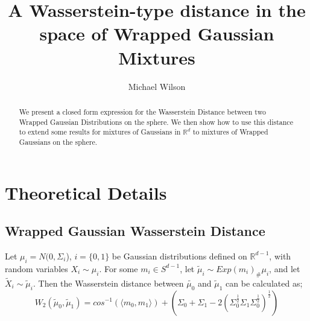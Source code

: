 \documentclass[]{article}
\title{A Wasserstein-type distance in the space of Wrapped Gaussian Mixtures}
\author{Michael Wilson}
\date{}
\begin{document}
	
	\maketitle
	
	\begin{abstract}
	We present a closed form expression for the Wasserstein Distance between two Wrapped Gaussian Distributions on the sphere. We then show how to use this distance to extend some results for mixtures of Gaussians in $\mathbb{R}^d$ to mixtures of Wrapped Gaussians on the sphere.  
	\end{abstract}


\section{Theoretical Details}

%
%



\subsection{Wrapped Gaussian Wasserstein Distance}

Let $\mu_i = N(0,\Sigma_i$), $i = \{0,1\}$ be Gaussian distributions defined on $\mathbb{R}^{d-1}$, with random variables $X_i \sim \mu_i$. For some $m_i \in S^{d-1}$, let $\tilde{\mu}_i \sim Exp(m_i)_\#\mu_i$, and let $\tilde{X}_i \sim \tilde{\mu}_i$. Then the Wasserstein distance between $\tilde{\mu_0}$ and $\tilde{\mu}_1$ can be calculated as;\\

\begin{equation}
	W_2(\tilde{\mu}_0, \tilde{\mu}_1) =  cos^{-1}(\langle m_0,m_1\rangle) + (\Sigma_0 + \Sigma_1 - 2 (\Sigma_0^{\frac{1}{2}} \Sigma_1 \Sigma_0^{\frac{1}{2}})^{\frac{1}{2}}) 
\end{equation} 
\end{document}
